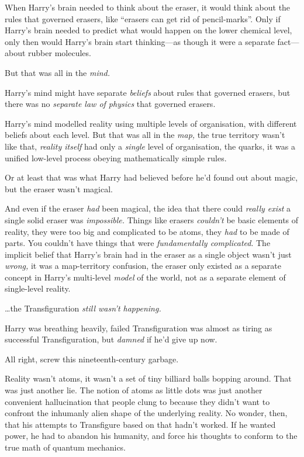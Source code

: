 When Harry's brain needed to think about the eraser, it would think
about the rules that governed erasers, like ``erasers can get rid of
pencil-marks''. Only if Harry's brain needed to predict what would
happen on the lower chemical level, only then would Harry's brain start
thinking---as though it were a separate fact---about rubber molecules.

But that was all in the \emph{mind.}

Harry's mind might have separate \emph{beliefs} about rules that
governed erasers, but there was no \emph{separate law of physics} that
governed erasers.

Harry's mind modelled reality using multiple levels of organisation,
with different beliefs about each level. But that was all in the
\emph{map,} the true territory wasn't like that, \emph{reality itself}
had only a \emph{single} level of organisation, the quarks, it was a
unified low-level process obeying mathematically simple rules.

Or at least that was what Harry had believed before he'd found out about
magic, but the eraser wasn't magical.

And even if the eraser \emph{had} been magical, the idea that there
could \emph{really exist} a single solid eraser was \emph{impossible.}
Things like erasers \emph{couldn't} be basic elements of reality, they
were too big and complicated to be atoms, they \emph{had} to be made of
parts. You couldn't have things that were \emph{fundamentally
complicated}. The implicit belief that Harry's brain had in the eraser
as a single object wasn't just \emph{wrong,} it was a map-territory
confusion, the eraser only existed as a separate concept in Harry's
multi-level \emph{model} of the world, not as a separate element of
single-level reality.

\ldots{}the Transfiguration \emph{still wasn't happening.}

Harry was breathing heavily, failed Transfiguration was almost as tiring
as successful Transfiguration, but \emph{damned} if he'd give up now.

All right, screw this nineteenth-century garbage.

Reality wasn't atoms, it wasn't a set of tiny billiard balls bopping
around. That was just another lie. The notion of atoms as little dots
was just another convenient hallucination that people clung to because
they didn't want to confront the inhumanly alien shape of the underlying
reality. No wonder, then, that his attempts to Transfigure based on that
hadn't worked. If he wanted power, he had to abandon his humanity, and
force his thoughts to conform to the true math of quantum mechanics.

